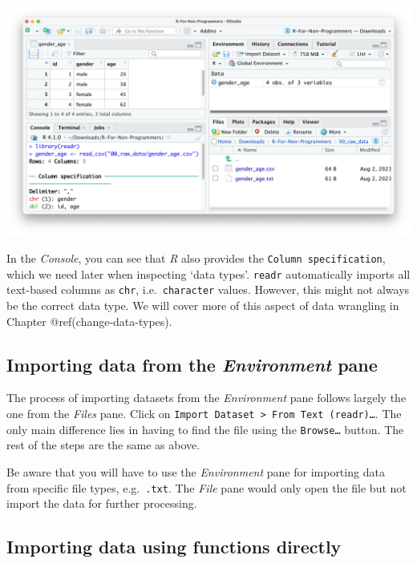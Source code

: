 \documentclass[
  letterpaper,
]{krantz}
\begin{document}
\begin{enumerate}
  \includegraphics{images/chapter_07_img/01_files_pane_import/04_files_pane_import.png}
\end{enumerate}

In the \emph{Console}, you can see that \emph{R} also provides the
\texttt{Column\ specification}, which we need later when inspecting
`data types'. \texttt{readr} automatically imports all text-based
columns as \texttt{chr}, i.e.~\texttt{character} values. However, this
might not always be the correct data type. We will cover more of this
aspect of data wrangling in Chapter @ref(change-data-types).

\subsection{\texorpdfstring{Importing data from the \emph{Environment}
pane}{Importing data from the Environment pane}}\label{importing-data-from-the-environment-pane}

The process of importing datasets from the \emph{Environment} pane
follows largely the one from the \emph{Files} pane. Click on
\texttt{Import\ Dataset\ \textgreater{}\ From\ Text\ (readr)…}. The only
main difference lies in having to find the file using the
\texttt{Browse…} button. The rest of the steps are the same as above.

Be aware that you will have to use the \emph{Environment} pane for
importing data from specific file types, e.g.~\texttt{.txt}. The
\emph{File} pane would only open the file but not import the data for
further processing.

\subsection{Importing data using functions
directly}\label{importing-data-using-functions}
\end{document}
